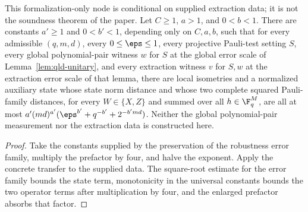 \begin{example}
  \label{lem:pauli-supplied-extraction-error-form-support}
  \leanok
  This formalization-only node is conditional on supplied extraction data; it
  is not the soundness theorem of the paper. Let $C\geq1$, $a>1$, and
  $0<b<1$. There are constants $a'\geq1$ and $0<b'<1$, depending only on
  $C,a,b$, such that for every admissible $(q,m,d)$, every $0\leq\eps\leq1$,
  every projective Pauli-test setting $S$, every global polynomial-pair
  witness $w$ for $S$ at the global error scale of
  Lemma~\ref{lem:qld-unitary}, and every extraction witness $v$ for $S,w$ at
  the extraction error scale of that lemma, there are local isometries and a
  normalized auxiliary state whose state norm distance and whose two complete
  squared Pauli-family distances, for every $W\in\{X,Z\}$ and summed over all
  $h\in\F_q^M$, are all at most
  $a'(md)^{a'}(\eps^{b'}+q^{-b'}+2^{-b'md})$. Neither the global
  polynomial-pair measurement nor the extraction data is constructed here.
\end{example}
\begin{proof}
  \leanok
  Take the constants supplied by the preservation of the robustness error
  family, multiply the prefactor by four, and halve the exponent. Apply the
  concrete transfer to the supplied data. The square-root estimate for the
  error family bounds the state term, monotonicity in the universal constants
  bounds the two operator terms after multiplication by four, and the enlarged
  prefactor absorbs that factor.
\end{proof}

